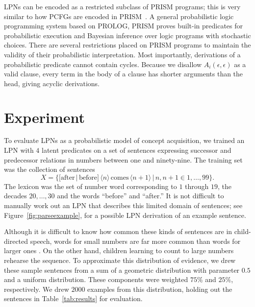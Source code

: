 \documentclass[10pt, twocolumn]{article}
\begin{document}
LPNs can be encoded as a restricted subclass of PRISM programs; this
is very similar to how PCFGs are encoded in
PRISM~\cite{DBLP:conf/cl/2000}. A general probabilistic logic
programming system based on PROLOG, PRISM proves built-in predicates
for probabilistic execution and Bayesian inference over logic programs
with stochastic choices. There are several
restrictions placed on PRISM programs to maintain the validity of
their probabilistic interpretation. Most importantly, derivations of a
probabilistic predicate cannot contain cycles. Because we disallow
$A_i(\epsilon,\epsilon)$ as a valid clause, every term in the body of a clause
has shorter arguments than the head, giving acyclic derivations.


\section{Experiment}

To evaluate LPNs as a probabilistic model of concept acquisition, we
trained an LPN with $4$ latent predicates on a set of sentences
expressing successor and predecessor relations in numbers between one
and ninety-nine. The training set was the collection of sentences $$X
= \{[\text{after}\, | \, \text{before}] \, \langle n \rangle \,
\text{comes} \, \langle n+1 \rangle \,|\, n, n+1 \in 1,\dots,99\}.$$ The
lexicon was the set of number word corresponding to $1$ through $19$,
the decades $20, \dots, 30$ and the words ``before'' and ``after.'' It
is not difficult to manually work out an LPN that describes this
limited domain of sentences; see Figure~\ref{fig:parseexample}, for a
possible LPN derivation of an example sentence.

Although it is difficult to know how common these kinds of sentences
are in child-directed speech, words for small numbers are far more
common than words for larger ones \cite{macwhinney2000childes}. On the
other hand, children learning to count to large numbers rehearse the
sequence. To approximate this distribution of evidence, we drew these
sample sentences from a sum of a geometric distribution with parameter
$0.5$ and a uniform distribution. These components were weighted
$75\%$ and $25\%$, respectively. We drew $2000$ examples from this
distribution, holding out the sentences in Table~\ref{tab:results} for
evaluation.
\end{document}
